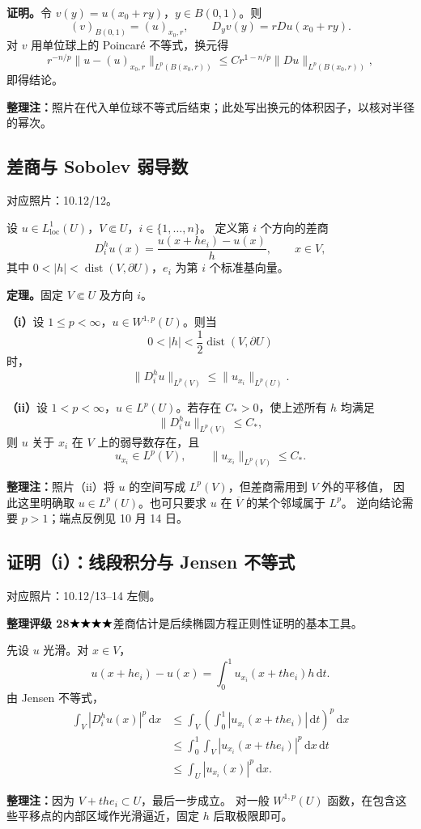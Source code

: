 \documentclass[UTF8,a4paper,11pt,fontset=fandol]{ctexart}
\newcommand{\dd}{\,\mathrm d}
\newcommand{\ednote}[1]{\par{\small\color{notegray}\textbf{整理注：}#1}\par}
\newcommand{\source}[1]{{\small\color{notegray}对应照片：#1。}\par}
\newcommand{\proofstars}[1]{\ensuremath{%
\ifnum#1>0\relax\bigstar\fi
\ifnum#1>1\relax\bigstar\fi
\ifnum#1>2\relax\bigstar\fi
\ifnum#1>3\relax\bigstar\fi
\ifnum#1>4\relax\bigstar\fi}}
\newcommand{\proofrating}[3]{\par{\small\color{proofblue}%
\textbf{整理评级 #1}\enspace\proofstars{#2}\quad #3\par}}
\begin{document}
\textbf{证明。}令 $v(y)=u(x_0+ry)$，$y\in B(0,1)$。则
\[
(v)_{B(0,1)}=(u)_{x_0,r},\qquad D_yv(y)=rDu(x_0+ry).
\]
对 $v$ 用单位球上的 Poincaré 不等式，换元得
\[
r^{-n/p}\|u-(u)_{x_0,r}\|_{L^p(B(x_0,r))}
\leq C r^{1-n/p}\|Du\|_{L^p(B(x_0,r))},
\]
即得结论。
\ednote{照片在代入单位球不等式后结束；此处写出换元的体积因子，以核对半径的幂次。}

\newpage
\subsection{差商与 Sobolev 弱导数}
\source{10.12/12}
设 $u\in L^1_{\mathrm{loc}}(U)$，$V\Subset U$，$i\in\{1,\ldots,n\}$。
定义第 $i$ 个方向的差商
\[
\boxed{D_i^hu(x)=\frac{u(x+he_i)-u(x)}{h},\qquad x\in V,}
\]
其中 $0<|h|<\operatorname{dist}(V,\partial U)$，$e_i$ 为第 $i$ 个标准基向量。

\textbf{定理。}固定 $V\Subset U$ 及方向 $i$。

\textbf{（i）}设 $1\leq p<\infty$，$u\in W^{1,p}(U)$。则当
\[
0<|h|<\frac12\operatorname{dist}(V,\partial U)
\]
时，
\[
\boxed{\|D_i^hu\|_{L^p(V)}\leq\|u_{x_i}\|_{L^p(U)}.}
\]

\textbf{（ii）}设 $1<p<\infty$，$u\in L^p(U)$。若存在 $C_*>0$，使上述所有 $h$ 均满足
\[
\|D_i^hu\|_{L^p(V)}\leq C_*,
\]
则 $u$ 关于 $x_i$ 在 $V$ 上的弱导数存在，且
\[
\boxed{u_{x_i}\in L^p(V),\qquad\|u_{x_i}\|_{L^p(V)}\leq C_*.}
\]
\ednote{照片（ii）将 $u$ 的空间写成 $L^p(V)$，但差商需用到 $V$ 外的平移值，
因此这里明确取 $u\in L^p(U)$。也可只要求 $u$ 在 $\overline V$ 的某个邻域属于 $L^p$。
逆向结论需要 $p>1$；端点反例见 10 月 14 日。}

\subsection*{证明（i）：线段积分与 Jensen 不等式}
\source{10.12/13--14 左侧}
\proofrating{28}{4}{差商估计是后续椭圆方程正则性证明的基本工具。}
先设 $u$ 光滑。对 $x\in V$，
\[
u(x+he_i)-u(x)=\int_0^1u_{x_i}(x+the_i)h\dd t.
\]
由 Jensen 不等式，
\[
\begin{aligned}
\int_V|D_i^hu(x)|^p\dd x
&\leq\int_V\left(\int_0^1|u_{x_i}(x+the_i)|\dd t\right)^p\dd x\\
&\leq\int_0^1\int_V|u_{x_i}(x+the_i)|^p\dd x\dd t\\
&\leq\int_U|u_{x_i}(x)|^p\dd x.
\end{aligned}
\]
\ednote{因为 $V+the_i\subset U$，最后一步成立。
对一般 $W^{1,p}(U)$ 函数，在包含这些平移点的内部区域作光滑逼近，固定 $h$ 后取极限即可。}
\end{document}
